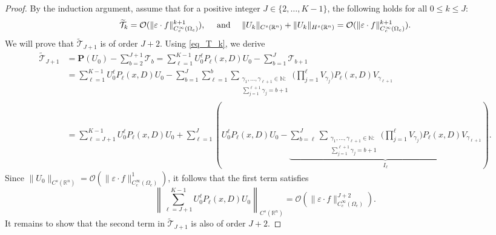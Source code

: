 \documentclass [oneside,11pt] {amsart}
\numberwithin{equation}{section}
\newcommand{\R}{\mathbb{R}}
\begin{document}
\begin{proof}
By the induction argument, assume that for a positive integer $J\in \{2,\ldots, K-1\}$, the following holds for all $0\leq k\leq J$:
$$
\widetilde {\mathcal{T}}_{k} =  \mathcal{O}(\|\varepsilon\cdot f\|^{k+1}_{C^\infty_c(\Omega_e)}),\quad \hbox{ and }\quad\| U_{k}\|_{C^{s}(\R^n)}+ \|U_k\|_{H^s(\R^n)} = \mathcal{O}(\|\varepsilon\cdot f\|^{k+1}_{C^\infty_c(\Omega_e)}).
$$
We will prove that $\widetilde {\mathcal{T}}_{J+1}$ is of order $J+2$. Using \eqref{eq_T_k}, we derive
\begin{align*}
\widetilde{\mathcal{T}}_{J+1} & = \mathbf{P}(U_0) - \sum_{b=2}^{J+1}\mathcal T_b = \sum_{\ell=1}^{K-1}U_0^\ell P_\ell (x,D)U_0 - \sum_{b=1}^{J}\mathcal T_{b+1}
\\ & =
\sum_{\ell=1}^{K-1}U_0^\ell P_\ell(x,D) U_0 - \sum_{b=1}^{J}\sum^{b}_{\ell=1} \sum_{\substack{ \gamma_1,\ldots, \gamma_{\ell+1}\in \mathbb{N}  : \\ \sum_{j=1}^{\ell+1}\gamma_j = b+1 }}  \bigg( \prod_{j=1}^\ell V_{\gamma_j} \bigg) P_\ell(x,D) V_{\gamma_{\ell+1}} 
\\ & =
\sum_{\ell = J+1}^{K-1}U_0^{\ell}P_\ell(x,D)U_0 +  \sum^{J}_{\ell=1} \left(U_0^ {\ell}P_\ell(x,D)U_0 - \underbrace{\sum_{b=\ell}^{J}\sum_{\substack{ \gamma_1,\ldots, \gamma_{\ell+1}\in \mathbb{N} : \\ \sum_{j=1}^{\ell+1}\gamma_j = b+1 }}  \bigg( \prod_{j=1}^\ell V_{\gamma_j} \bigg)    P_\ell(x,D)V_{\gamma_{\ell+1}} }_{I_\ell}\right).
\end{align*}	
Since $\|U_0\|_{C^s(\R^n)} =\mathcal{O}(\|\varepsilon\cdot f\|^{1}_{C_c^\infty(\Omega_e)})$, it follows that the first term satisfies 
\[
\left\| \sum_{\ell = J+1}^{K-1}U_0^{\ell}P_\ell(x,D)U_0 \right\|_{C^s(\R^n)} =\mathcal{O}(\|\varepsilon\cdot f\|^{J+2}_{C_c^\infty(\Omega_e)}). 
\]
It remains to show that the second term in $\widetilde{\mathcal{T}}_{J+1}$ is also of order $J+2$.


\end{proof}
\end{document}
